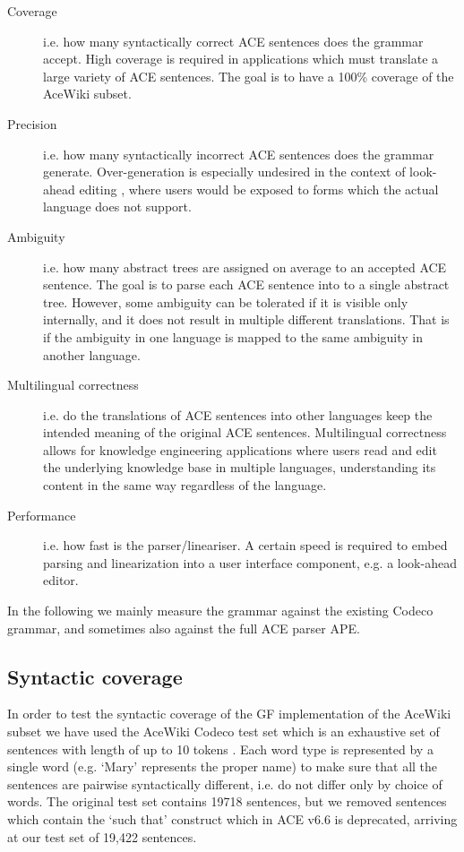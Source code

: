 \documentclass[a4paper]{article}
\begin{document}
\begin{description}
\item[Coverage]
i.e. how many syntactically correct ACE sentences does the grammar accept.
High coverage is required in applications which must translate a large variety
of ACE sentences. The goal is to have a 100\% coverage of the AceWiki subset.

\item[Precision]
i.e. how many syntactically incorrect ACE sentences does the grammar generate.
Over-generation is especially undesired in the context of look-ahead editing
\cite{schwitter:eamt-claw2003}, where users would be exposed to
forms which the actual language does not support.

\item[Ambiguity]
i.e. how many abstract trees are assigned on average to an accepted ACE
sentence. The goal is to parse each ACE sentence into to a single abstract
tree. However, some ambiguity can be tolerated if it is visible only internally,
and it does not result in multiple different translations.
That is if the ambiguity in one language is mapped to the same ambiguity in
another language.

\item[Multilingual correctness]
i.e. do the translations of ACE sentences into other languages keep the
intended meaning of the original ACE sentences. Multilingual correctness allows
for knowledge engineering applications where users read and edit the underlying
knowledge base in multiple languages, understanding its content in the same
way regardless of the language.

\item[Performance]
i.e. how fast is the parser/lineariser. A certain speed is required to embed
parsing and linearization into a user interface component, e.g. a look-ahead
editor.
\end{description}

In the following we mainly measure the grammar against the existing
Codeco grammar, and sometimes also against the full ACE parser APE.

\subsection{Syntactic coverage}

In order to test the syntactic coverage of the GF implementation of the
AceWiki subset we have used the AceWiki Codeco test set which
is an exhaustive set of sentences with length of up to 10
tokens \cite{kuhn2010doctoralthesis}. Each word
type is represented by a single word (e.g. `Mary' represents the proper name)
to make sure that all the sentences are pairwise syntactically different, i.e.
do not differ only by choice of words.
The original test set contains 19718 sentences, but we removed sentences which
contain the `such that' construct which in ACE v6.6 is deprecated,
arriving at our test set of 19,422 sentences.
\end{document}
